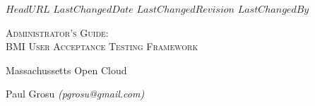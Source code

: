 \svnidlong
{$HeadURL$}
{$LastChangedDate$}
{$LastChangedRevision$}
{$LastChangedBy$}

\thispagestyle{titlepage}

\begin{center}
  \newlength{\parSepLength}
  \setlength{\parSepLength}{10ex}

  \Large
  \centering

  \thinRule\par
  \par\vspace{0.15\parSepLength}
  \begin{minipage}{\textwidth}
    \centering
    \fontsize{40pt}{36pt}\selectfont\titleColor\scshape
   Administrator's Guide: \\ \HUGE BMI User Acceptance Testing Framework
  \end{minipage}
  \par\vspace{0.25\parSepLength}
  \par\thinRule

  \vspace{0.125\parSepLength}

  \begin{minipage}{\textwidth}
    \centering
    \small
    Massachussetts Open Cloud %
  \end{minipage}

  \vfill

  \begin{minipage}{\textwidth}
    \centering
    \Large
    Paul Grosu \emph{(pgrosu@gmail.com)} \\
  \end{minipage}

  \vfill


\end{center}
